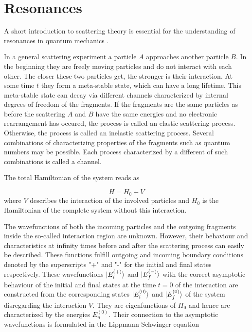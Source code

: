 \chapter{Resonances}

A short introduction to scattering theory is essential for the understanding
of resonances in quantum mechanics \cite{nolting52,Gell-Mann53,Taylor87}.

In a general scattering experiment a particle $A$ approaches another
particle $B$. In the beginning they are freely moving particles and do not interact
with each other. The closer these two particles get, the stronger is their interaction.
At some time $t$ they form a meta-stable state, which can have a long lifetime.
This meta-stable state can decay via different channels characterized
by internal degrees of freedom of the fragments. If the fragments are the
same particles as before the scattering $A$ and $B$ have the same
energies and no electronic rearrangement
has occured, the process is called an elastic scattering process.
Otherwise, the process is called an inelastic scattering process.
Several combinations of characterizing properties of the fragments such as
quantum numbers may be possible. Each process characterized by a different
of such combinations is called a channel.

The total Hamiltonian of the system reads as

\begin{equation}
 H = H_0 + V
\end{equation}
where $V$ describes the interaction of the involved particles and
$H_0$ is the Hamiltonian of the complete system without this interaction.

The wavefunctions of both the incoming particles and the outgoing
fragments inside the so-called interaction region are unknown.
However, their behaviour and characteristics at infinity times before
and after the scattering process can easily be described.
These functions fulfill outgoing and incoming boundary conditions
denoted by the superscripts "+" and "-" for the initial and final states
respectively.
These wavefunctions $\ket{E_i^{(+)}}$ and $\ket{E_f^{(-)}}$ with the correct
asymptotic behaviour
of the initial and final states at the time $t=0$ of the interaction
are constructed from the corresponding states $\ket{E_i^{(0)}}$ and
$\ket{E_f^{(0)}}$ of the system disregarding the interaction $V$.
They are eigenfunctions of $H_0$ and hence
are characterized by the energies $E_n^{(0)}$.
Their connection to the asymptotic wavefunctions is
formulated in the Lippmann-Schwinger equation


